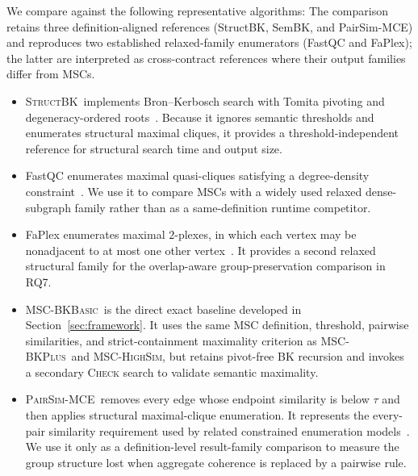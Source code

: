 \documentclass[sigconf, nonacm]{acmart}
\newcommand{\StructBK}{\textsc{Struct\-BK}}
\newcommand{\semBK}{MSC-\textsc{BKBasic}}
\newcommand{\subEnum}{MSC-\textsc{BKPlus}}
\newcommand{\monoSemMCE}{MSC-\textsc{HighSim}}
\newcommand{\pairSim}{\textsc{PairSim-MCE}}
\begin{document}
We compare against the following representative algorithms:
The comparison retains three definition-aligned references (StructBK, SemBK,
and PairSim-MCE) and reproduces two established relaxed-family enumerators
(FastQC and FaPlex); the latter are interpreted as cross-contract references
where their output families differ from MSCs.
\begin{itemize}[leftmargin=1.25em,itemsep=0.25ex,topsep=0.4ex,parsep=0pt]
  \item \StructBK\ implements Bron--Kerbosch search with Tomita pivoting and
  degeneracy-ordered roots~\cite{bron1973,tomita2006,eppstein2010,eppstein2013}.
  Because it ignores semantic thresholds and enumerates structural maximal
  cliques, it provides a threshold-independent reference for structural search
  time and output size.

  \item FastQC enumerates maximal quasi-cliques satisfying a degree-density
  constraint~\cite{yu2023fastqc}. We use it to compare MSCs with a widely used
  relaxed dense-subgraph family rather than as a same-definition runtime
  competitor.

  \item FaPlex enumerates maximal $2$-plexes, in which each vertex may be
  nonadjacent to at most one other vertex~\cite{zhou2020faplex}. It provides a
  second relaxed structural family for the overlap-aware group-preservation
  comparison in RQ7.
  
  \item \semBK\ is the direct exact baseline developed in
  Section~\ref{sec:framework}. It uses the same MSC definition, threshold,
  pairwise similarities, and strict-containment maximality criterion as
  \subEnum\ and \monoSemMCE, but retains pivot-free BK recursion and invokes a
  secondary \textsc{Check} search to validate semantic maximality.

  \item \pairSim\ removes every edge whose endpoint similarity is below
  $\tau$ and then applies structural maximal-clique enumeration. It represents
  the every-pair similarity requirement used by related constrained
  enumeration models~\cite{yao2022similarbiclique}. We use it only as a
  definition-level result-family comparison to measure the group structure
  lost when aggregate coherence is replaced by a pairwise rule.
  
\end{itemize}
\end{document}
